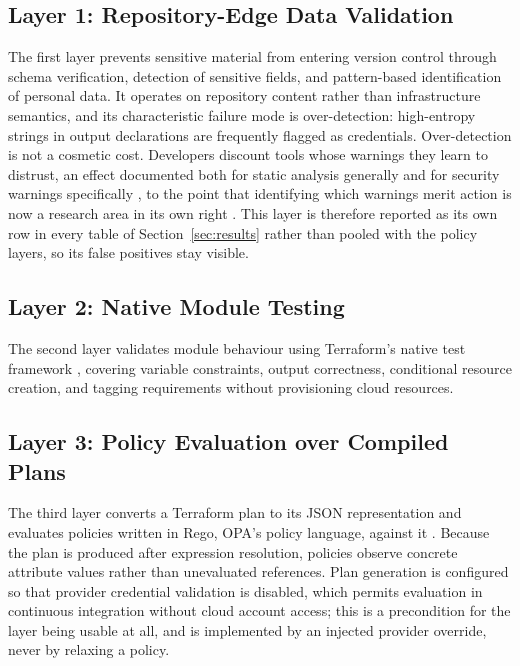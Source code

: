 \documentclass[smallextended]{svjour3}
\begin{document}
\subsection{Layer 1: Repository-Edge Data Validation}
The first layer prevents sensitive material from entering version control through
schema verification, detection of sensitive fields, and pattern-based
identification of personal data. It operates on repository content rather than
infrastructure semantics, and its characteristic failure mode is over-detection:
high-entropy strings in output declarations are frequently flagged as
credentials. Over-detection is not a cosmetic cost. Developers discount tools
whose warnings they learn to distrust, an effect documented both for static
analysis generally \citep{vassallo2019engage} and for security warnings
specifically \citep{tahaei2021notifications}, to the point that identifying which
warnings merit action is now a research area in its own right
\citep{ge2023actionable}. This layer is therefore reported as its own row in every
table of Section~\ref{sec:results} rather than pooled with the policy layers, so
its false positives stay visible.

\subsection{Layer 2: Native Module Testing}
The second layer validates module behaviour using Terraform's native test
framework \citep{hashicorp2024tests}, covering variable constraints, output
correctness, conditional resource creation, and tagging requirements without
provisioning cloud resources.

\subsection{Layer 3: Policy Evaluation over Compiled Plans}
The third layer converts a Terraform plan to its JSON representation and
evaluates policies written in Rego, OPA's policy language, against it
\citep{openpolicyagent2024}. Because the plan
is produced after expression resolution, policies observe concrete attribute
values rather than unevaluated references. Plan generation is configured so that
provider credential validation is disabled, which permits evaluation in
continuous integration without cloud account access; this is a precondition for
the layer being usable at all, and is implemented by an injected provider
override, never by relaxing a policy.
\end{document}
